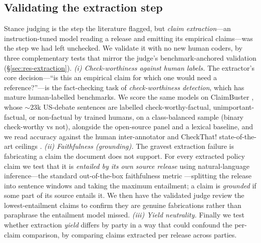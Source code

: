 \subsection{Validating the extraction step}
\label{sec:methods-extraction}
Stance judging is the step the literature flagged, but \emph{claim extraction}---an instruction-tuned
model reading a release and emitting its empirical claims---was the step we had left unchecked. We
validate it with no new human coders, by three complementary tests that mirror the judge's
benchmark-anchored validation (\S\ref{sec:res-extraction}).
\emph{(i) Check-worthiness against human labels.} The extractor's core decision---``is this an empirical
claim for which one would need a reference?''---is the fact-checking task of \emph{check-worthiness
detection}, which has mature human-labelled benchmarks. We score the same models on ClaimBuster
\citep{hassan2017claimbuster}, whose ${\sim}23$k US-debate sentences are labelled check-worthy-factual,
unimportant-factual, or non-factual by trained humans, on a class-balanced sample (binary check-worthy
vs not), alongside the open-source panel and a lexical baseline, and we read accuracy against the human
inter-annotator and CheckThat! state-of-the-art ceilings \citep{barron2020checkthat}.
\emph{(ii) Faithfulness (grounding).} The gravest extraction failure is fabricating a claim the document
does not support. For every extracted policy claim we test that it is \emph{entailed by its own source
release} using natural-language inference---the standard out-of-the-box faithfulness metric
\citep{honovich2022true,laurer2024less}---splitting the release into sentence windows and taking the
maximum entailment; a claim is \emph{grounded} if some part of its source entails it. We then have the
validated judge review the lowest-entailment claims to confirm they are genuine fabrications rather than
paraphrase the entailment model missed.
\emph{(iii) Yield neutrality.} Finally we test whether extraction \emph{yield} differs by party in a way
that could confound the per-claim comparison, by comparing claims extracted per release across parties.

